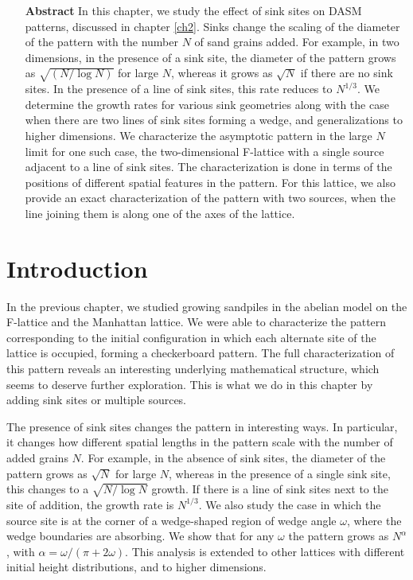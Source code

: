 \documentclass[11pt,a4paper]{book}
\begin{document}
\begin{itemize}
\item[\textbf{Abstract}]
In this chapter, we study the effect of sink sites on DASM patterns, discussed in chapter
\ref{ch2}. Sinks
change the scaling of the diameter of the pattern with the number $N$ of sand
grains added. For example, in two dimensions, in the presence of a sink site, the
diameter of the pattern grows as $\sqrt{(N/\log N)}$ for large $N$, whereas it
grows as $\sqrt{N}$ if there are no sink sites. In the presence of a line of sink
sites, this rate reduces to $N^{1/3}$. We determine the growth rates for various sink geometries along with the case when there are
two lines of sink sites forming a wedge, and generalizations to higher dimensions.
We characterize the asymptotic pattern in the large $N$ limit for one such case, the two-dimensional F-lattice
with a single source adjacent to a line of sink sites. The characterization is done in terms of the positions of different
spatial features in the pattern. For this lattice, we also provide an exact
characterization of the pattern with two sources, when the line joining them is along one of the axes of the lattice. 
\end{itemize}


\section{Introduction}
In the previous chapter, we studied growing sandpiles in the abelian model on
the F-lattice and the Manhattan lattice.
We were able to characterize the pattern corresponding to the initial configuration in which each alternate
site of the lattice is occupied, forming a checkerboard pattern. The full characterization of this
pattern reveals an interesting underlying mathematical structure,
which seems to deserve further exploration. This is what we do in
this chapter by adding sink sites or multiple sources.  

The presence of sink sites changes the pattern in interesting ways. In
particular, it changes how different spatial lengths in the pattern
scale with the number of added grains $N$. For example, in the absence of
sink sites, the diameter of the pattern grows as $\sqrt{N}$ for large
$N$, whereas in the presence of a single sink site,
this changes to a $\sqrt{N/\log{N}}$ growth. If there is a line of
sink sites next to the site of addition, the growth rate is $N^{1/3}$.
We also study the case in which the source site is at the corner of a
wedge-shaped region of wedge angle $\omega$, where the wedge boundaries
are absorbing. We show that for any $\omega$ the pattern grows as
$N^{\alpha}$, with $\alpha=\omega/(\pi+2\omega)$. This analysis
is extended to other lattices with different initial
height distributions, and to higher dimensions.
\end{document}
